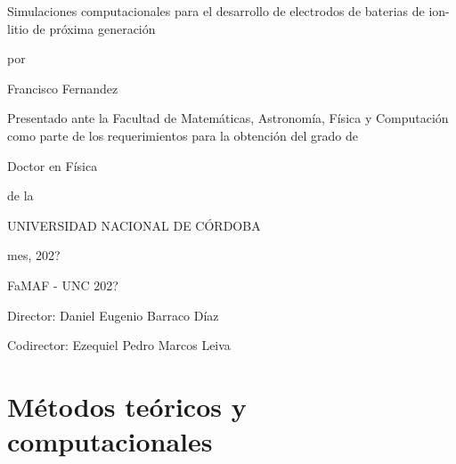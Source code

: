 \documentclass[12pt,spanish,a4paper]{book}
\newcommand\blankpage{%
    \null
    \thispagestyle{empty}%
    \addtocounter{page}{-1}%
    \newpage}
\begin{document}
\blankpage
\blankpage

\thispagestyle{empty}
\begin{center}
{\large

    \vspace{1cm}

    {\Huge Simulaciones computacionales para el desarrollo de electrodos de 
            baterias de ion-litio de próxima generación}
    
    \vspace{0.5cm}
    por
    \vspace{0.5cm}
    
    {\Large Francisco Fernandez}

    \vspace{0.5cm}

    Presentado ante la Facultad de Matemáticas, Astronomía, Física y Computación 
    como parte de los requerimientos para la obtención del grado de
    
    \vspace{0.5cm}

    {\Large Doctor en Física}

    \vspace{0.5cm}
    de la

    UNIVERSIDAD NACIONAL DE CÓRDOBA

    \vspace{0.5cm}
    
    mes, 202?

    \textcopyright FaMAF - UNC 202?

    \vspace{1.5cm}

    Director: Daniel Eugenio Barraco Díaz

    Codirector: Ezequiel Pedro Marcos Leiva

}
\end{center}





% 
\chapter[Métodos teóricos y computacionales]{Métodos teóricos y computacionales}


% 



\end{document}
